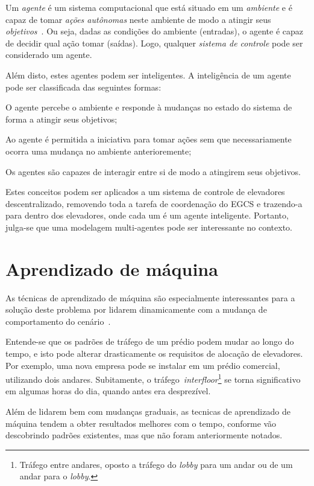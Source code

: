 Um \textit{agente} é um sistema computacional que está situado em um \textit{ambiente} e é capaz de tomar \textit{ações autônomas} neste ambiente de modo a atingir seus \textit{objetivos}~\cite{Woolridge:2001:IMS:559667}. Ou seja, dadas as condições do ambiente (entradas), o agente é capaz de decidir qual ação tomar (saídas). Logo, qualquer \textit{sistema de controle} pode ser considerado um agente.

Além disto, estes agentes podem ser inteligentes. A inteligência de um agente pode ser classificada das seguintes formas:

\begin{description}[leftmargin=!,labelwidth=\widthof{\bfseries Pró-ativa}]
  \item[Reativa]    O agente percebe o ambiente e responde à mudanças no estado
                    do sistema de forma a atingir seus objetivos;
  \item[Pró-ativa]  Ao agente é permitida a iniciativa para tomar ações sem que
                    necessariamente ocorra uma mudança no ambiente
                    anterioremente;
  \item[Social]     Os agentes são capazes de interagir entre si de modo a
                    atingirem seus objetivos.
\end{description}

Estes conceitos podem ser aplicados a um sistema de controle de elevadores
descentralizado, removendo toda a tarefa de coordenação do EGCS e trazendo-a
para dentro dos elevadores, onde cada um é um agente inteligente. Portanto,
julga-se que uma modelagem multi-agentes pode ser interessante no contexto.

\section{\label{section:machinelearning}Aprendizado de máquina}

As técnicas de aprendizado de máquina são especialmente interessantes para a
solução deste problema por lidarem dinamicamente com a mudança de comportamento
do cenário~\cite{Russell:2003:AIM:773294}.

Entende-se que os padrões de tráfego de um prédio podem mudar ao longo do tempo,
e isto pode alterar drasticamente os requisitos de alocação de elevadores. Por
exemplo, uma nova empresa pode se instalar em um prédio comercial, utilizando
dois andares. Subitamente, o tráfego~\textit{interfloor}\footnote{Tráfego entre
andares, oposto a tráfego do \textit{lobby} para um andar ou de um andar para
o \textit{lobby}.} se torna significativo em algumas horas do dia, quando antes
era desprezível.

Além de lidarem bem com mudanças graduais, as tecnicas de aprendizado de máquina
tendem a obter resultados melhores com o tempo, conforme vão descobrindo padrões
existentes, mas que não foram anteriormente notados.
